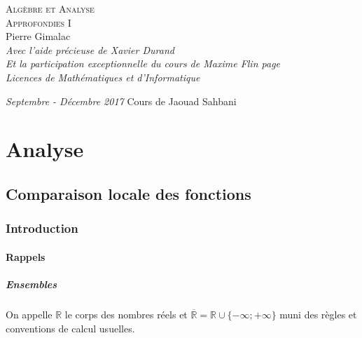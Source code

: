 \documentclass[a4paper,10pt]{book} %
\newcommand{\R}{\mathbb{R}}
\newcommand{\Rb}{\overline{\mathbb{R}}}
\begin{document}
\begin{titlepage}
\thispagestyle{empty}
\begin{center}
\vspace*{6.7cm}
\Huge \textsc{Algèbre et Analyse\\ Approfondies I}\\
\vspace{1.5cm}
\Large Pierre Gimalac\\
\vspace{0.2cm}
\normalsize\textit{Avec l'aide précieuse de Xavier Durand}\\
\small \textit{Et la participation exceptionnelle du cours de Maxime Flin page \pageref{maxime}}\\
\vspace{0.5cm}
\large \textit{Licences de Mathématiques et d'Informatique}
\vfill
\end{center}
\large \textit{Septembre - Décembre 2017}
\hfill 
\large Cours de Jaouad Sahbani
\restoregeometry
\end{titlepage}

\renewcommand{\contentsname}{Sommaire}
\thispagestyle{empty}
\tableofcontents
\thispagestyle{empty}

\part{Analyse}


\chapter{Comparaison locale des fonctions}
\section{Introduction}
\subsection{Rappels}
\subsubsection{Ensembles}
On appelle $\R$ le corps des nombres réels et $\Rb=\R \cup \{-\infty ; + \infty \}$ muni des règles et conventions de calcul usuelles.
\end{document}
